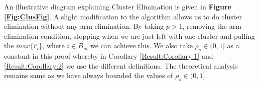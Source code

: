 
An illustrative diagram explaining Cluster Elimination is given in \textbf{Figure \ref{Fig:ClusFig}}. A slight modification to the algorithm allows us to do cluster elimination without any arm elimination. By taking $p>1$, removing the arm elimination condition, stopping when we are just left with one cluster and pulling the $max\lbrace \hat{r}_{i}\rbrace$, where ${i}\in B_{m}$ we can achieve this. We also take $\rho_{s}\in (0,1]$ as a constant in this proof whereby in Corollary \ref{Result:Corollary:1} and \ref{Result:Corollary:2} we use the different definitions. The theoretical analysis remains same as we have always bounded the values of $\rho_{s}\in (0,1]$.
 

